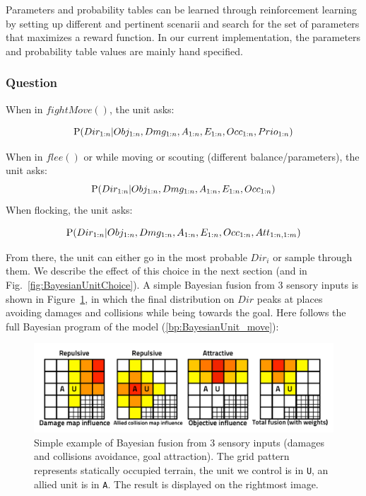Parameters and probability tables can be learned through reinforcement learning \citep{Sutton,Asmuth09} by setting up different and pertinent scenarii and search for the set of parameters that maximizes a reward function. In our current implementation, the parameters and probability table values are mainly hand specified.

\subsubsection{Question}

When in $fightMove()$, the unit asks:
\begin{small}
$$\mathrm{P}(Dir_{1:n} | Obj_{1:n}, Dmg_{1:n}, A_{1:n}, E_{1:n}, Occ_{1:n}, Prio_{1:n})$$
\end{small}
When in $flee()$ or while moving or scouting (different balance/parameters), the unit asks:
$$\mathrm{P}(Dir_{1:n} | Obj_{1:n}, Dmg_{1:n}, A_{1:n}, E_{1:n}, Occ_{1:n})$$
When flocking, the unit asks:
\begin{small}
$$\mathrm{P}(Dir_{1:n} | Obj_{1:n}, Dmg_{1:n}, A_{1:n}, E_{1:n}, Occ_{1:n}, Att_{1:n,1:m}) $$
\end{small}
From there, the unit can either go in the most probable $Dir_i$ or sample through them. We describe the effect of this choice in the next section (and in Fig.~\ref{fig:BayesianUnitChoice}). A simple Bayesian fusion from 3 sensory inputs is shown in Figure~\ref{fig:BayesianUnitExample}, in which the final distribution on $Dir$ peaks at places avoiding damages and collisions while being towards the goal. Here follows the full Bayesian program of the model (\ref{bp:BayesianUnit_move}):

\begin{figure}[h]
\begin{center}
\includegraphics[width=13cm]{images/example_BayesianUnit.pdf}
\end{center}
\caption{Simple example of Bayesian fusion from 3 sensory inputs (damages and collisions avoidance, goal attraction). The grid pattern represents statically occupied terrain, the unit we control is in \texttt{U}, an allied unit is in \texttt{A}. The result is displayed on the rightmost image.}
\label{fig:BayesianUnitExample}
\end{figure}

